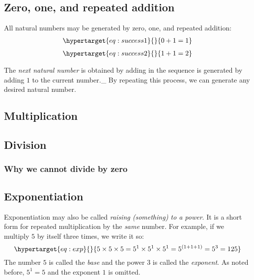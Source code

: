 \documentclass[
  a4paper,
]{article}
\begin{document}
\hypertarget{zero-one-and-repeated-addition}{%
\subsection{Zero, one, and repeated
addition}\label{zero-one-and-repeated-addition}}

All natural numbers may be generated by zero, one, and repeated
addition: \begin{equation}\protect\hypertarget{eq:success1}{}{
\begin{aligned}
0 + 1 = 1
\end{aligned}
}\label{eq:success1}\end{equation}
\begin{equation}\protect\hypertarget{eq:success2}{}{
\begin{aligned}
1 + 1 = 2
\end{aligned}
}\label{eq:success2}\end{equation}

The \emph{next natural number} is obtained by adding in the sequence is
generated by adding \(1\) to the current number.\_ By repeating this
process, we can generate any desired natural number.

\hypertarget{multiplication}{%
\subsection{Multiplication}\label{multiplication}}

\hypertarget{division}{%
\subsection{Division}\label{division}}

\hypertarget{why-we-cannot-divide-by-zero}{%
\subsubsection{Why we cannot divide by
zero}\label{why-we-cannot-divide-by-zero}}

\hypertarget{exponentiation}{%
\subsection{Exponentiation}\label{exponentiation}}

Exponentiation may also be called \emph{raising (something) to a power}.
It is a short form for repeated multiplication by the \emph{same}
number. For example, if we multiply \(5\) by itself three times, we
write it so: \begin{equation}\protect\hypertarget{eq:exp}{}{
5\times5\times5 = 5^1\times5^1\times5^1 = 5^{(1+1+1)} = 5^{3} = 125
}\label{eq:exp}\end{equation} The number \(5\) is called the \emph{base}
and the power \(3\) is called the \emph{exponent}. As noted before,
\(5^1 = 5\) and the exponent \(1\) is omitted.
\end{document}
